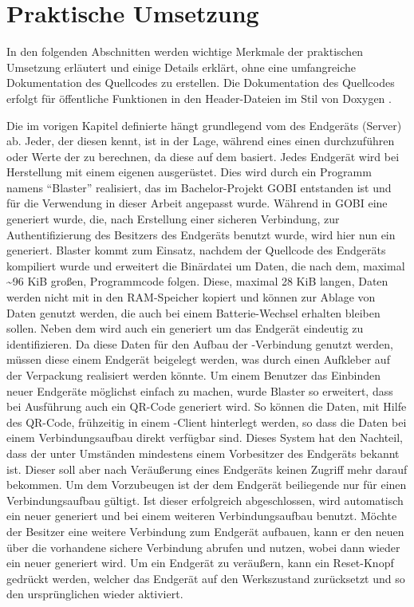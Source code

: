 \chapter{Praktische Umsetzung}
\label{chp:praktisch}

In den folgenden Abschnitten werden wichtige Merkmale der praktischen Umsetzung erläutert und einige Details erklärt,
ohne eine umfangreiche Dokumentation des Quellcodes zu erstellen. Die Dokumentation des Quellcodes erfolgt für öffentliche
Funktionen in den Header-Dateien im Stil von Doxygen \cite{doxygen}.

Die im vorigen Kapitel definierte  hängt grundlegend vom  des Endgeräts (Server) ab. Jeder, der diesen kennt, ist in
der Lage, während eines  einen  durchzuführen oder Werte der  zu berechnen, da diese auf dem  basiert.
Jedes Endgerät wird bei Herstellung mit einem eigenen  ausgerüstet. Dies wird durch ein Programm namens "`Blaster"' realisiert, das
im Bachelor-Projekt GOBI entstanden ist und für die Verwendung in dieser Arbeit angepasst wurde. Während in GOBI eine  generiert wurde,
die, nach Erstellung einer sicheren Verbindung, zur Authentifizierung des Besitzers des Endgeräts benutzt wurde, wird hier nun ein 
generiert. Blaster kommt zum Einsatz, nachdem der Quellcode des Endgeräts kompiliert wurde und erweitert die Binärdatei um Daten, die nach dem,
maximal \textasciitilde 96 KiB großen, Programmcode folgen. Diese, maximal 28 KiB langen, Daten werden nicht mit in den RAM-Speicher kopiert und können zur
Ablage von Daten genutzt werden, die auch bei einem Batterie-Wechsel erhalten bleiben sollen. Neben dem  wird auch ein 
generiert um das Endgerät eindeutig zu identifizieren. Da diese Daten für den Aufbau der -Verbindung genutzt werden, müssen diese
einem Endgerät beigelegt werden, was durch einen Aufkleber auf der Verpackung realisiert werden könnte. Um einem Benutzer das Einbinden neuer
Endgeräte möglichst einfach zu machen, wurde Blaster so erweitert, dass bei Ausführung auch ein QR-Code generiert wird. So können die Daten, mit
Hilfe des QR-Code, frühzeitig in einem -Client hinterlegt werden, so dass die Daten bei einem Verbindungsaufbau direkt verfügbar sind.
Dieses System hat den Nachteil, dass der  unter Umständen mindestens einem Vorbesitzer des Endgeräts bekannt ist. Dieser soll aber nach
Veräußerung eines Endgeräts keinen Zugriff mehr darauf bekommen. Um dem Vorzubeugen ist der dem Endgerät beiliegende  nur für einen
Verbindungsaufbau gültigt. Ist dieser erfolgreich abgeschlossen, wird automatisch ein neuer  generiert und bei einem weiteren Verbindungsaufbau
benutzt. Möchte der Besitzer eine weitere Verbindung zum Endgerät aufbauen, kann er den neuen  über die vorhandene sichere Verbindung abrufen
und nutzen, wobei dann wieder ein neuer  generiert wird. Um ein Endgerät zu veräußern, kann ein Reset-Knopf gedrückt werden, welcher das
Endgerät auf den Werkszustand zurücksetzt und so den ursprünglichen  wieder aktiviert.



